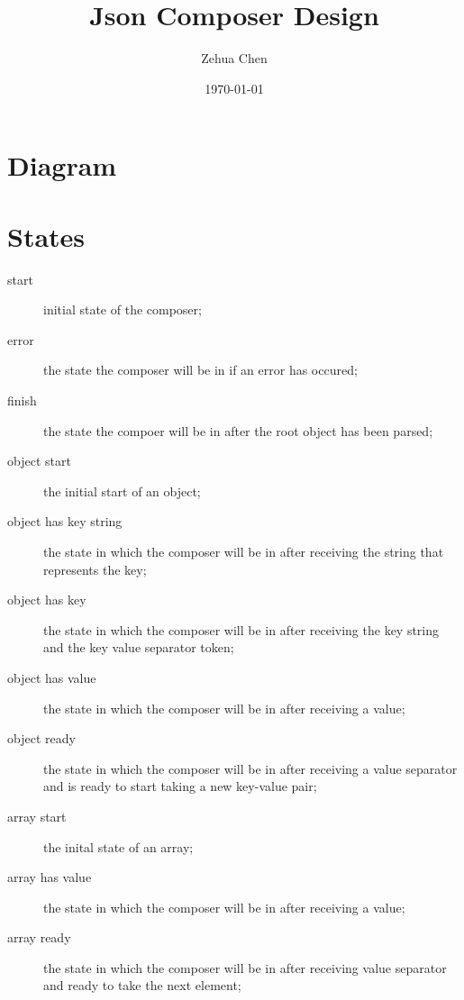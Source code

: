 \documentclass[11pt, letterpaper]{article}
\title{Json Composer Design}
\author{Zehua Chen}
\date{\today}
\newcommand{\objectstart}{o\_s}
\newcommand{\arraystart}{a\_s}
\begin{document}
  \maketitle
  
  \section{Diagram}
  
    \begin{figure}[H]
      \centering
    \end{figure}
  
  \section{States}
  
    \begin{description}
      \item[start] initial state of the composer;
      \item[error] the state the composer will be in if an error has occured; 
      \item[finish] the state the compoer will be in after the root object has
      been parsed;  
      \item[object start] the initial start of an object;
      \item[object has key string] the state in which the composer will be in 
      after receiving the string that represents the key;
      \item[object has key] the state in which the composer will be in after 
      receiving the key string and the key value separator 
      token;
      \item[object has value] the state in which the composer will be in after
      receiving a value;
      \item[object ready] the state in which the composer will be in after 
      receiving a value separator and is ready to start 
      taking a new key-value pair; 
      \item[array start] the inital state of an array;
      \item[array has value] the state in which the composer will be in after 
      receiving a value;  
      \item[array ready] the state in which the composer will be in after 
      receiving value separator and ready to take the next element; 
    \end{description}
    
\end{document}
